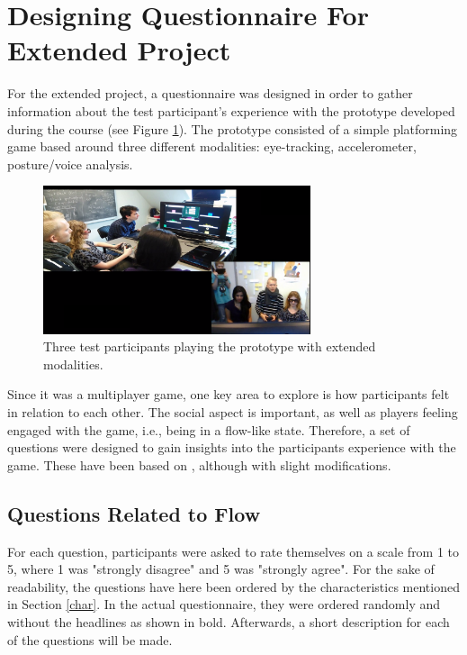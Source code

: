 \section{Designing Questionnaire For Extended Project} \label{qustionnaire}
For the extended project, a questionnaire was designed in order to gather information about the test participant's experience with the prototype developed during the course (see Figure \ref{fig:prototype}). The prototype consisted of a simple platforming game based around three different modalities: eye-tracking, accelerometer, posture/voice analysis.

\begin{figure}[htbp]
\centering
\includegraphics[width=0.70\textwidth]{Pictures/extended_modality}
\caption{Three test participants playing the prototype with extended modalities.}
\label{fig:prototype}
\end{figure}

Since it was a multiplayer game, one key area to explore is how participants felt in relation to each other. The social aspect is important, as well as players feeling engaged with the game, i.e., being in a flow-like state. Therefore, a set of questions were designed to gain insights into the participants experience with the game. These have been based on \cite{imiOne}, although with slight modifications.

\subsection{Questions Related to Flow}
For each question, participants were asked to rate themselves on a scale from 1 to 5, where 1 was "strongly disagree" and 5 was "strongly agree". For the sake of readability, the questions have here been ordered by the characteristics mentioned in Section \ref{char}. In the actual questionnaire, they were ordered randomly and without the headlines as shown in bold. Afterwards, a short description for each of the questions will be made.


